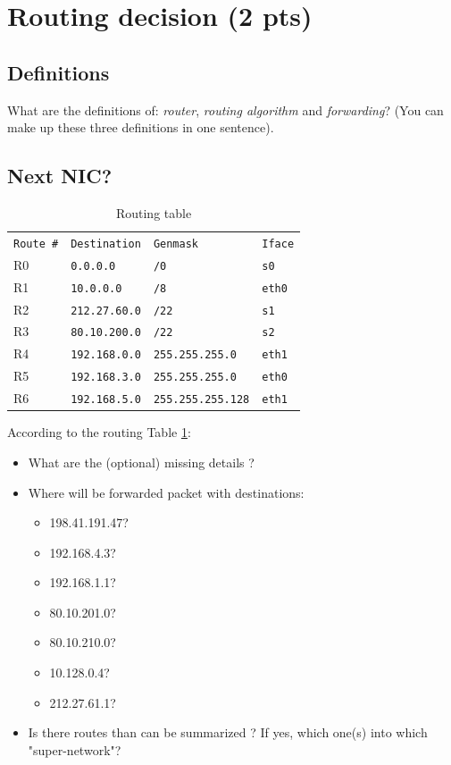 \documentclass[11pt]{article}
\begin{document}
\section{Routing decision (2 pts)}
	\subsection{Definitions}
		What are the definitions of: \emph{router}, \emph{routing algorithm} and \emph{forwarding}? (You can make up these three definitions in one sentence).
\vspace{3cm}

	\subsection{Next NIC?}
		\begin{table}[h]
		  \centering
		      \begin{tabular}{llll}
		      		\verb+Route #+	&	\verb+Destination+	& \verb+Genmask+		& \verb+Iface+ \\
		      		R0				&	\verb+0.0.0.0+ 		& \verb+/0+		 		& \verb+s0+ \\
		      		R1				&	\verb+10.0.0.0+		& \verb+/8+				& \verb+eth0+ \\
		      		R2				&	\verb+212.27.60.0+	& \verb+/22+			& \verb+s1+ \\
		      		R3				&	\verb+80.10.200.0+	& \verb+/22+			& \verb+s2+ \\
		      		R4				&	\verb+192.168.0.0+	& \verb+255.255.255.0+	& \verb+eth1+ \\
		      		R5				&	\verb+192.168.3.0+	& \verb+255.255.255.0+	& \verb+eth0+ \\
		      		R6				&	\verb+192.168.5.0+	& \verb+255.255.255.128+& \verb+eth1+ \\
		      \end{tabular}
		      \caption{Routing table}
		  \label{tab:routing}
		\end{table}

		According to the routing Table \ref{tab:routing}:
		\begin{itemize}
			\item What are the (optional) missing details ?
			\item Where will be forwarded packet with destinations:
			\begin{itemize}
				\item 198.41.191.47?
				\item 192.168.4.3?
				\item 192.168.1.1?
				\item 80.10.201.0?
				\item 80.10.210.0?
				\item 10.128.0.4?
				\item 212.27.61.1?
			\end{itemize}
			\item Is there routes than can be summarized ? If yes, which one(s) into which "super-network"?
		\end{itemize}
\end{document}
